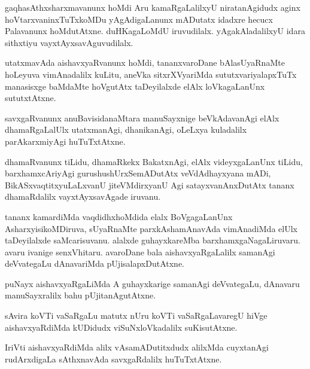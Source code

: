 \documentclass{article}
\begin{document}
\begin{mn}%
gaqhasAthxsharxmavanunx hoMdi Aru kamaRgaLalilxyU niratanAgidudx aginx
hoVtarxvaninxTuTxkoMDu yAgAdigaLanunx mADutatx idadxre hecucx
Palavanunx hoMdutAtxne. duHKagaLoMdU iruvudilalx. yAgakAladalilxyU
idara sithxtiyu vayxtAyxsavAguvudilalx.
\end{mn}

\begin{mn}
utatxmavAda aishavxyaRvanunx hoMdi, tananxvaroDane bAlasUyaRnaMte
hoLeyuva vimAnadalilx kuLitu, aneVka sitxrXVyariMda
sututxvariyalapxTuTx manasisxge baMdaMte  hoVgutAtx taDeyilalxde elAlx
loVkagaLanUnx sututxtAtxne.
\end{mn}

\begin{mn}%
savxgaRvanunx anuBavisidanaMtara manuSayxnige beVkAdavanAgi elAlx
dhamaRgaLalUlx utatxmanAgi, dhanikanAgi, oLeLxya kuladalilx
parAkarxmiyAgi huTuTxtAtxne.
\end{mn}

\begin{mn}%
dhamaRvanunx tiLidu, dhamaRkekx BakatxnAgi, elAlx videyxgaLanUnx
tiLidu, barxhamxcAriyAgi gurushushUrxSemADutAtx veVdAdhayxyana mADi,
BikASxvaqtitxyuLaLxvanU jiteVMdirxyanU Agi satayxvanAnxDutAtx tananx
dhamaRdalilx vayxtAyxsavAgade iruvanu.
\end{mn}

\begin{mn}
tananx kamardiMda vaqdidhxhoMdida elalx BoVgagaLanUnx
AsharxyisikoMDiruva, sUyaRnaMte parxkAshamAnavAda vimAnadiMda elUlx
taDeyilalxde saMcarisuvanu. alalxde guhayxkareMba
barxhamxgaNagaLiruvaru. avaru ivanige senxVhitaru. avaroDane bala
aishavxyaRgaLalilx samanAgi deVvategaLu dAnavariMda pUjisalapxDutAtxne.
\end{mn}

\begin{mn}
puNayx aishavxyaRgaLiMda A guhayxkarige samanAgi deVvategaLu, dAnavaru
manuSayxralilx bahu pUjitanAgutAtxne.
\end{mn}

\begin{mn}
sAvira koVTi vaSaRgaLu matutx nUru koVTi vaSaRgaLavaregU hiVge
aishavxyaRdiMda kUDidudx viSuNxloVkadalilx suKisutAtxne.
\end{mn}

\begin{mn}
IriVti aishavxyaRdiMda alilx vAsamADutitxdudx alilxMda cuyxtanAgi
rudArxdigaLa sAthxnavAda savxgaRdalilx huTuTxtAtxne.
\end{mn}
\end{document}
